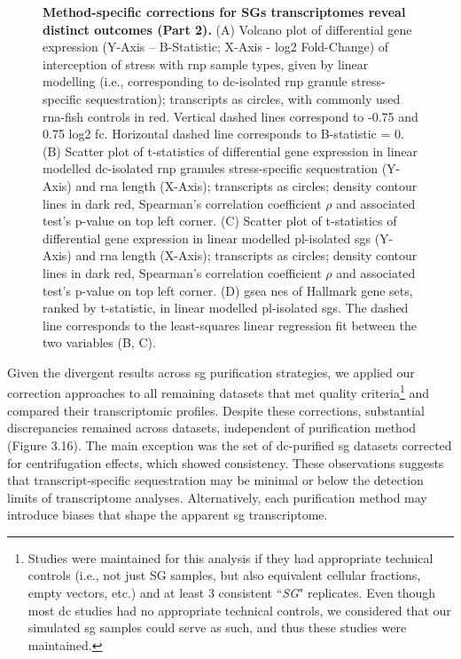 \begin{figure}[t]
	\captionsetup{labelformat=adja-page}
	\ContinuedFloat
	\caption[]{\textbf{Method-specific corrections for SGs transcriptomes reveal distinct outcomes (Part 2).} (A) Volcano plot of differential gene expression (Y-Axis – B-Statistic; X-Axis - log2 Fold-Change) of interception of stress with \gls{rnp} sample types, given by linear modelling (i.e., corresponding to \gls{dc}-isolated \gls{rnp} granule stress-specific sequestration\cite{matheny_transcriptome-wide_2019}); transcripts as circles, with commonly used \gls{rna}-\gls{fish} controls\cite{khong_stress_2017} in red. Vertical dashed lines correspond to -0.75 and 0.75 log2 \gls{fc}. Horizontal dashed line corresponds to B-statistic = 0. (B) Scatter plot of t-statistics of differential gene expression in linear modelled \gls{dc}-isolated \gls{rnp} granules stress-specific sequestration\cite{matheny_transcriptome-wide_2019} (Y-Axis) and \gls{rna} length (X-Axis); transcripts as circles; density contour lines in dark red, Spearman's correlation coefficient $\rho$ and associated test's p-value on top left corner. (C) Scatter plot of t-statistics of differential gene expression in linear modelled \gls{pl}-isolated \glspl{sg}\cite{somasekharan_g3bp1-linked_2020} (Y-Axis) and \gls{rna} length (X-Axis); transcripts as circles; density contour lines in dark red, Spearman's correlation coefficient $\rho$ and associated test's p-value on top left corner. (D) \gls{gsea} \gls{nes} of Hallmark gene sets, ranked by t-statistic, in linear modelled \gls{pl}-isolated \glspl{sg}\cite{somasekharan_g3bp1-linked_2020}. The dashed line corresponds to the least-squares linear regression fit between the two variables (B, C).}
\end{figure}
\noindent
Given the divergent results across \gls{sg} purification strategies, we applied our correction approaches to all remaining datasets that met quality criteria\footnote{Studies were maintained for this analysis if they had appropriate technical controls (i.e., not just SG samples, but also equivalent cellular fractions, empty vectors, etc.) and at least 3 consistent ``\textit{SG}" replicates. Even though most \gls{dc} studies had no appropriate technical controls, we considered that our simulated \gls{sg} samples could serve as such, and thus these studies were maintained.} and compared their transcriptomic profiles. Despite these corrections, substantial discrepancies remained across datasets, independent of purification method (Figure 3.16). The main exception was the set of \gls{dc}-purified \gls{sg} datasets corrected for centrifugation effects, which showed consistency. These observations suggests that transcript-specific sequestration may be minimal or below the detection limits of transcriptome analyses. Alternatively, each purification method may introduce biases that shape the apparent \gls{sg} transcriptome.
